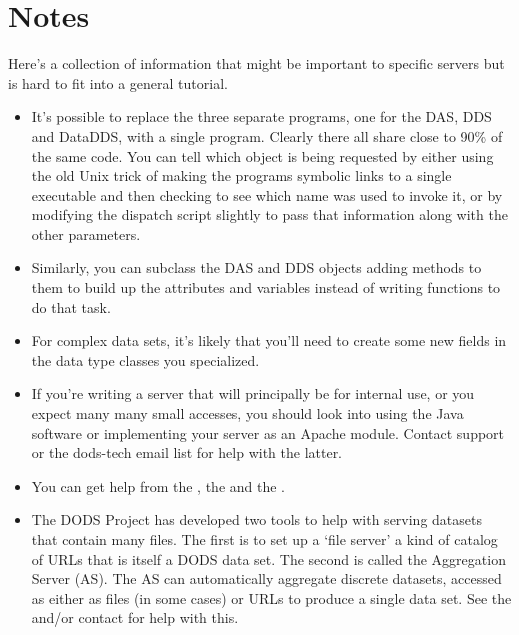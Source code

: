 \documentclass{dods-paper}
\begin{document}
\section{Notes}

Here's a collection of information that might be important to specific
servers but is hard to fit into a general tutorial.

\begin{itemize}

\item It's possible to replace the three separate programs, one for the DAS,
  DDS and DataDDS, with a single program. Clearly there all share close to
  90\% of the same code. You can tell which object is being requested by
  either using the old Unix trick of making the programs symbolic links to a
  single executable and then checking to see which name was used to invoke
  it, or by modifying the dispatch script slightly to pass that information
  along with the other parameters.

\item Similarly, you can subclass the DAS and DDS objects adding methods to
  them to build up the attributes and variables instead of writing functions
  to do that task. 

\item For complex data sets, it's likely that you'll need to create some new
  fields in the data type classes you specialized.

\item If you're writing a server that will principally be for internal use, or
  you expect many many small accesses, you should look into using the Java
  software or implementing your server as an Apache module. Contact support
  or the dods-tech email list for help with the latter.
  
\item You can get help from the , the 
  and the .
  
\item The DODS Project has developed two tools to help with serving datasets
  that contain many files. The first is to set up a `file server' a kind of
  catalog of URLs that is itself a DODS data set. The second is called the
  Aggregation Server (AS). The AS can automatically aggregate discrete
  datasets, accessed as either as files (in some cases) or URLs to produce a
  single data set. See the  and/or contact  for help with this.


\end{itemize}
\end{document}
